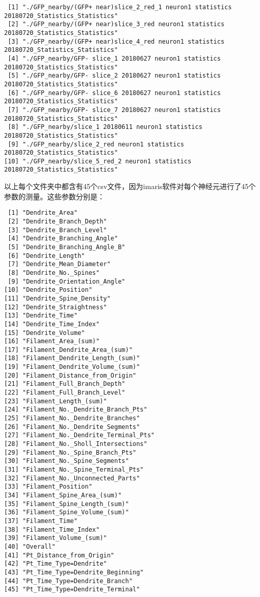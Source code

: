 \documentclass[]{article}
\begin{document}
\begin{verbatim}
 [1] "./GFP_nearby/(GFP+ near)slice_2_red_1 neuron1 statistics 20180720_Statistics_Statistics"
 [2] "./GFP_nearby/(GFP+ near)slice_3_red neuron1 statistics 20180720_Statistics_Statistics"  
 [3] "./GFP_nearby/(GFP+ near)slice_4_red neuron1 statistics 20180720_Statistics_Statistics"  
 [4] "./GFP_nearby/GFP- slice_1 20180627 neuron1 statistics 20180720_Statistics_Statistics"   
 [5] "./GFP_nearby/GFP- slice_2 20180627 neuron1 statistics 20180720_Statistics_Statistics"   
 [6] "./GFP_nearby/GFP- slice_6 20180627 neuron1 statistics 20180720_Statistics_Statistics"   
 [7] "./GFP_nearby/GFP- slice_7 20180627 neuron1 statistics 20180720_Statistics_Statistics"   
 [8] "./GFP_nearby/slice_1 20180611 neuron1 statistics 20180720_Statistics_Statistics"        
 [9] "./GFP_nearby/slice_2_red neuron1 statistics 20180720_Statistics_Statistics"             
[10] "./GFP_nearby/slice_5_red_2 neuron1 statistics 20180720_Statistics_Statistics"           
\end{verbatim}

以上每个文件夹中都含有45个csv文件，因为imaris软件对每个神经元进行了45个参数的测量。这些参数分别是：

\begin{verbatim}
 [1] "Dendrite_Area"                     
 [2] "Dendrite_Branch_Depth"             
 [3] "Dendrite_Branch_Level"             
 [4] "Dendrite_Branching_Angle"          
 [5] "Dendrite_Branching_Angle_B"        
 [6] "Dendrite_Length"                   
 [7] "Dendrite_Mean_Diameter"            
 [8] "Dendrite_No._Spines"               
 [9] "Dendrite_Orientation_Angle"        
[10] "Dendrite_Position"                 
[11] "Dendrite_Spine_Density"            
[12] "Dendrite_Straightness"             
[13] "Dendrite_Time"                     
[14] "Dendrite_Time_Index"               
[15] "Dendrite_Volume"                   
[16] "Filament_Area_(sum)"               
[17] "Filament_Dendrite_Area_(sum)"      
[18] "Filament_Dendrite_Length_(sum)"    
[19] "Filament_Dendrite_Volume_(sum)"    
[20] "Filament_Distance_from_Origin"     
[21] "Filament_Full_Branch_Depth"        
[22] "Filament_Full_Branch_Level"        
[23] "Filament_Length_(sum)"             
[24] "Filament_No._Dendrite_Branch_Pts"  
[25] "Filament_No._Dendrite_Branches"    
[26] "Filament_No._Dendrite_Segments"    
[27] "Filament_No._Dendrite_Terminal_Pts"
[28] "Filament_No._Sholl_Intersections"  
[29] "Filament_No._Spine_Branch_Pts"     
[30] "Filament_No._Spine_Segments"       
[31] "Filament_No._Spine_Terminal_Pts"   
[32] "Filament_No._Unconnected_Parts"    
[33] "Filament_Position"                 
[34] "Filament_Spine_Area_(sum)"         
[35] "Filament_Spine_Length_(sum)"       
[36] "Filament_Spine_Volume_(sum)"       
[37] "Filament_Time"                     
[38] "Filament_Time_Index"               
[39] "Filament_Volume_(sum)"             
[40] "Overall"                           
[41] "Pt_Distance_from_Origin"           
[42] "Pt_Time_Type=Dendrite"             
[43] "Pt_Time_Type=Dendrite_Beginning"   
[44] "Pt_Time_Type=Dendrite_Branch"      
[45] "Pt_Time_Type=Dendrite_Terminal"    
\end{verbatim}
\end{document}
